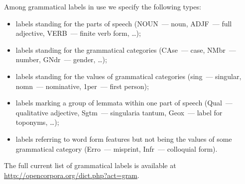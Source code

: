 \documentclass[a4paper]{article}
\begin{document}
Among grammatical labels in use we specify the following types:
\begin{itemize}
\item labels standing for the parts of speech (NOUN~--- noun, ADJF~--- full adjective, VERB~--- finite verb form, \ldots);
\item labels standing for the grammatical categories (CAse~--- case, NMbr~--- number, GNdr~--- gender, \ldots);
\item labels standing for the values of grammatical categories (sing~--- singular, nomn~--- nominative, 1per~--- first person);
\item labels marking a group of lemmata within one part of speech (Qual~--- qualitative adjective, Sgtm~--- singularia tantum, Geox~--- label for toponyms, \ldots);
\item labels referring to word form features but not being the values of some grammatical category (Erro~--- misprint, Infr~--- colloquial form).
\end{itemize}

The full current list of grammatical labels is available at \url{http://opencorpora.org/dict.php?act=gram}.
\end{document}
